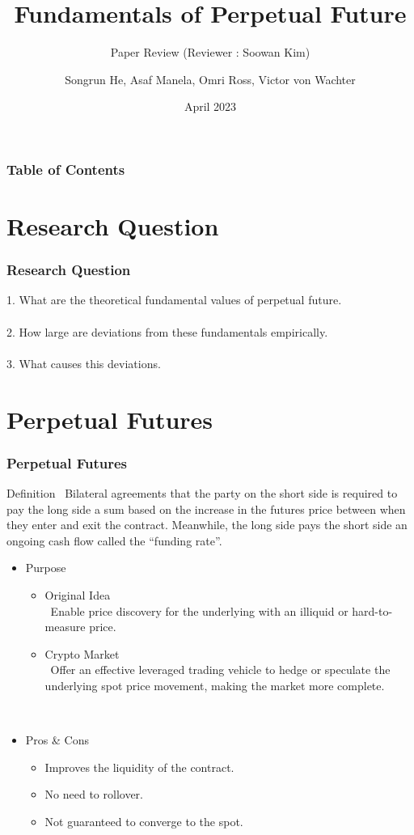 \documentclass{beamer}
\title{Fundamentals of Perpetual Future}
\subtitle{Paper Review (Reviewer : Soowan Kim)}
\author{Songrun He, Asaf Manela, Omri Ross, Victor von Wachter}
\date{April 2023}
\begin{document}
\frame{\titlepage}

\begin{frame}
\frametitle{Table of Contents}
\tableofcontents
\end{frame}

\section{Research Question}

\begin{frame}
\frametitle{Research Question}
1. What are the theoretical fundamental values of perpetual future.\\~\\
2. How large are deviations from these fundamentals empirically.\\~\\
3. What causes this deviations.
\end{frame}

\section{Perpetual Futures}

\begin{frame}
\frametitle{Perpetual Futures}
\begin{block}{Definition}
~Bilateral agreements that the party on the short side is required to pay the long side a sum based on the \alert{increase in the futures price} between when they enter and exit the contract.
Meanwhile, the long side pays the short side an ongoing cash flow called the \alert{“funding rate”}.
\end{block}
\end{frame}

\begin{frame}
\begin{itemize}
    \item Purpose
    \begin{itemize}
        \item Original Idea\\~Enable price discovery for the underlying with an illiquid or hard-to-measure price. 
        \item Crypto Market\\~Offer an effective leveraged trading vehicle to hedge or speculate the underlying spot price movement, making the market more complete.
    \end{itemize}
    ~\\
    \item Pros \& Cons
    \begin{itemize}
        \item Improves the liquidity of the contract.
        \item No need to rollover.
        \item Not guaranteed to converge to the spot.
    \end{itemize}
\end{itemize}
\end{frame}
\end{document}

